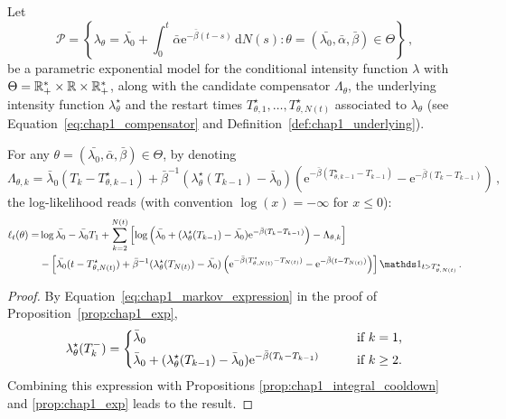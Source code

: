 \begin{corollary}
  Let
  \begin{equation}
    \mathcal P = \left\{ \lambda_\theta = \bar{\lambda_0} + \int_{0}^{t}{\bar \alpha \mathrm{e}^{-\bar \beta(t-s)}\,\mathrm{d}N(s)} : \theta=(\bar{\lambda_0}, \bar \alpha, \bar \beta) \in \Theta \right\}\,,
    \label{eq:chap1_model}
  \end{equation}
  be a parametric exponential model for the conditional intensity function $\lambda$ with $\Theta = {\mathbb R}_+^* \times {\mathbb R} \times {\mathbb R}_+^*$,
  along with the candidate compensator $\Lambda_\theta$, the underlying intensity function $\lambda_\theta^\star$ and the restart times $T_{\theta, 1}^\star,\ldots, T_{\theta, N(t)}^\star$ associated to $\lambda_\theta$ (see Equation~\eqref{eq:chap1_compensator} and Definition~\ref{def:chap1_underlying}). %

  For any $\theta=(\bar{\lambda_0}, \bar \alpha, \bar \beta) \in \Theta$, by denoting
  \[
    \Lambda_{\theta, k} =
    \bar \lambda_0(T_k - T_{\theta, k-1}^\star) + \bar \beta^{-1} (\lambda_\theta^\star(T_{k-1}) - \bar \lambda_0) (\mathrm{e}^{-\bar \beta(T_{\theta, k-1}^\star-T_{k-1})}-\mathrm{e}^{-\bar \beta(T_k-T_{k-1})})\,,
  \]
  the log-likelihood reads (with convention $\log(x) = -\infty$ for $x \leq 0$):
  \begin{align}
      \ell_t(\theta)
      =& \log{\bar{\lambda_0}}
      - \bar{\lambda_0} T_1
      + \sum_{k=2}^{N(t)} \left[ \log \left(\bar{\lambda_0} + (\lambda_\theta^\star(T_{k-1}) - \bar{\lambda_0}) \mathrm{e}^{-\bar \beta(T_{k}-T_{k-1})} \right) - \Lambda_{\theta, k} \right] \notag\\
      &- \left[ \bar{\lambda_0} (t - T_{\theta, N(t)}^\star) + \bar \beta^{-1} (\lambda_\theta^\star(T_{N(t)}) - \bar{\lambda_0}) \left(\mathrm{e}^{-\bar \beta(T_{\theta, N(t)}^\star-T_{N(t)})}-\mathrm{e}^{-\bar \beta(t-T_{N(t)})} \right) \right] \II_{t > T_{\theta, N(t)}^\star}
      \label{eq:chap1_likeli_exp}\,.
  \end{align}
  \label{cor:chap1_loglik}
\end{corollary}
\begin{proof}
  By Equation~\eqref{eq:chap1_markov_expression} in the proof of Proposition~\ref{prop:chap1_exp},
  \begin{equation*}
  \lambda_\theta^\star(T_k^-) =
  \begin{dcases}
      \bar \lambda_0 &\text{\qquad if $k = 1$,}\\
      \bar \lambda_0 + (\lambda_\theta^\star(T_{k-1}) - \bar \lambda_0) \mathrm{e}^{-\bar \beta(T_{k}-T_{k-1})} &\text{\qquad if $k\geq2$.}
  \end{dcases}
\end{equation*}
Combining this expression with Propositions \ref{prop:chap1_integral_cooldown} and \ref{prop:chap1_exp} leads to the result.
\end{proof}

